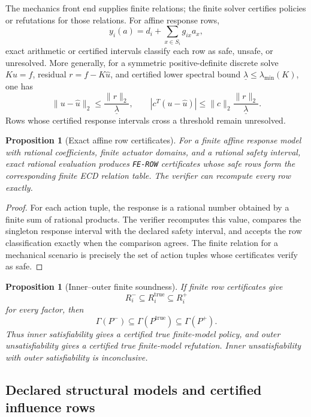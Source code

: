 \documentclass[11pt]{article}
\theoremstyle{plain}
\newtheorem{proposition}[theorem]{Proposition}
\theoremstyle{definition}
\theoremstyle{remark}
\begin{document}
The mechanics front end supplies finite relations; the finite solver certifies
policies or refutations for those relations.  For affine response rows,
\[
  y_i(a)=d_i+\sum_{x\in S_i}g_{ix}a_x,
\]
exact arithmetic or certified intervals classify each row as safe, unsafe, or
unresolved.  More generally, for a symmetric positive-definite discrete solve
\(Ku=f\), residual \(r=f-K\widehat u\), and certified lower spectral bound
\(\underline\lambda\le\lambda_{
\min}(K)\), one has
\[
  \|u-\widehat u\|_2\le \frac{\|r\|_2}{\underline\lambda},
  \qquad
  |c^T(u-\widehat u)|\le
  \|c\|_2\frac{\|r\|_2}{\underline\lambda}.
\]
Rows whose certified response intervals cross a threshold remain unresolved.

\begin{proposition}[Exact affine row certificates]
\label{prop:exact-affine-row-certificates}
For a finite affine response model with rational coefficients, finite actuator
domains, and a rational safety interval, exact rational evaluation produces
\texttt{FE-ROW} certificates whose safe rows form the corresponding finite ECD
relation table.  The verifier can recompute every row exactly.
\end{proposition}

\begin{proof}
For each action tuple, the response is a rational number obtained by a finite
sum of rational products.  The verifier recomputes this value, compares the
singleton response interval with the declared safety interval, and accepts the
row classification exactly when the comparison agrees.  The finite relation for
a mechanical scenario is precisely the set of action tuples whose certificates
verify as safe.
\end{proof}

\begin{proposition}[Inner--outer finite soundness]
If finite row certificates give
\[
  R_i^-\subseteq R_i^{\mathrm{true}}\subseteq R_i^+
\]
for every factor, then
\[
  \Gamma(P^-)\subseteq\Gamma(P^{\mathrm{true}})\subseteq\Gamma(P^+).
\]
Thus inner satisfiability gives a certified true finite-model policy, and outer
unsatisfiability gives a certified true finite-model refutation.  Inner
unsatisfiability with outer satisfiability is inconclusive.
\end{proposition}

\subsection{Declared structural models and certified influence rows}
\label{subsec:structural-front-end}
\end{document}
